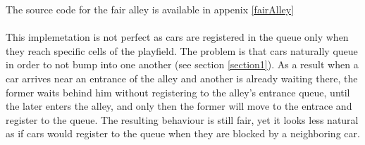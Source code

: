 The source code for the fair alley is available in appenix \ref{fairAlley}
~\\
~\\
This implemetation is not perfect as cars are registered in the queue only when
they reach specific cells of the playfield. The problem is that cars naturally
queue in order to not bump into one another (see section \ref{section1}). As a
result when a car arrives near an entrance of the alley and another is already
waiting there, the former waits behind him without registering to the
alley's entrance queue, until the later enters the alley, and only then the
former will move to the entrace and register to the queue. The resulting
behaviour is still fair, yet it looks less natural as if cars would register to
the queue when they are blocked by a neighboring car.

